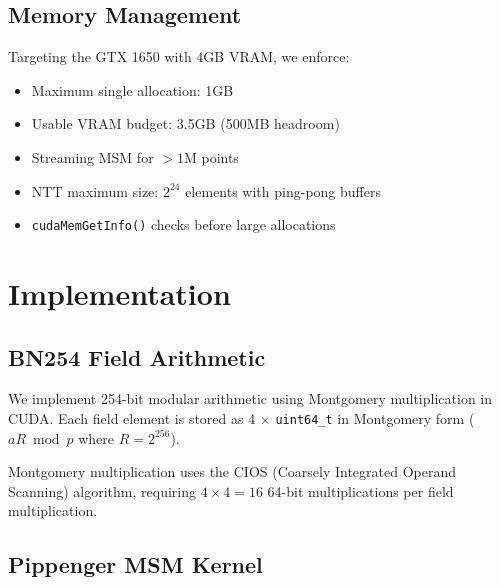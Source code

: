 \documentclass[11pt,a4paper]{article}
\begin{document}
\subsection{Memory Management}

Targeting the GTX 1650 with 4GB VRAM, we enforce:
\begin{itemize}
  \item Maximum single allocation: 1GB
  \item Usable VRAM budget: 3.5GB (500MB headroom)
  \item Streaming MSM for $> 1\text{M}$ points
  \item NTT maximum size: $2^{24}$ elements with ping-pong buffers
  \item \texttt{cudaMemGetInfo()} checks before large allocations
\end{itemize}

\section{Implementation}

\subsection{BN254 Field Arithmetic}

We implement 254-bit modular arithmetic using Montgomery multiplication
in CUDA. Each field element is stored as 4 $\times$ \texttt{uint64\_t}
in Montgomery form ($aR \bmod p$ where $R = 2^{256}$).

Montgomery multiplication uses the CIOS (Coarsely Integrated Operand
Scanning) algorithm, requiring $4 \times 4 = 16$ 64-bit multiplications
per field multiplication.

\subsection{Pippenger MSM Kernel}
\end{document}
